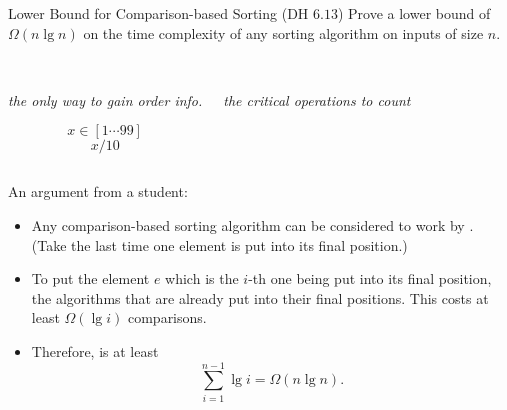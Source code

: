 \begin{frame}{}
  \begin{exampleblock}{Lower Bound for Comparison-based Sorting (DH $6.13$)}
    Prove a lower bound of $\Omega(n \lg n)$
    on the time complexity of any  sorting 
    algorithm on inputs of size $n$.
  \end{exampleblock}

  \vspace{0.30cm}
  \begin{columns}
    \pause
      \begin{center}
	 \\[6pt]
	{\it the only way to gain order info.}

	\pause
	\[
	  x \in [1 \cdots 99]
	\]
	\[
	  x / 10
	\]
      \end{center}
    \pause
      \begin{center}
	 \\[6pt]
	{\it the critical operations to count}
      \end{center}

      \pause
  \end{columns}
\end{frame}

\begin{frame}{}
  \begin{exampleblock}{An argument from a student:}
    \begin{itemize}[<+->]
      \setlength{\itemsep}{4pt}
      \item Any comparison-based sorting algorithm can be considered to work 
	by . 
	(Take the last time one element is put into its final position.)
      \item To put the element $e$ which is the $i$-th one being put into its final position, 
	the algorithms 
	that are already put into their final positions. 
	This costs at least $\Omega(\lg i)$ comparisons.
      \item Therefore,  is at least 
	\[
	  \sum_{i=1}^{n-1} \lg i = \Omega(n \lg n).
	\]
    \end{itemize}
  \end{exampleblock}
\end{frame}

